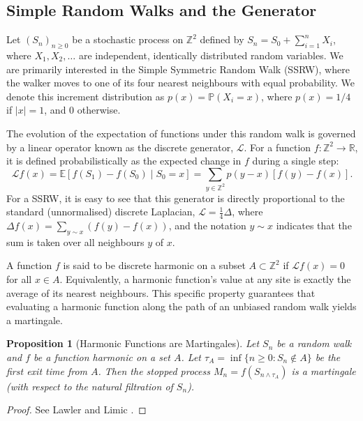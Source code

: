 \documentclass[12pt, a4paper, oneside]{report}
\newtheorem{proposition}[theorem]{Proposition}
\theoremstyle{remark}
\begin{document}
\subsection{Simple Random Walks and the Generator}
\label{sec:rw_generator}

Let $(S_n)_{n \geq 0}$ be a stochastic process on $\mathbb{Z}^2$ defined by $S_n = S_0 + \sum_{i=1}^n X_i$, where $X_1, X_2, \dots$ are independent, identically distributed random variables. We are primarily interested in the Simple Symmetric Random Walk (SSRW), where the walker moves to one of its four nearest neighbours with equal probability. We denote this increment distribution as $p(x) = \mathbb{P}(X_i = x)$, where $p(x) = 1/4$ if $|x| = 1$, and $0$ otherwise.

The evolution of the expectation of functions under this random walk is governed by a linear operator known as the discrete generator, $\mathcal{L}$. For a function $f: \mathbb{Z}^2 \to \mathbb{R}$, it is defined probabilistically as the expected change in $f$ during a single step:
\begin{equation*}
    \mathcal{L}f(x) = \mathbb{E}[f(S_1) - f(S_0) \mid S_0 = x] = \sum_{y \in \mathbb{Z}^2} p(y-x) [f(y) - f(x)].
\end{equation*}
For a SSRW, it is easy to see that this generator is directly proportional to the standard (unnormalised) discrete Laplacian, $\mathcal{L} = \frac{1}{4} \Delta$, where $\Delta f(x) = \sum_{y \sim x} (f(y) - f(x))$, and the notation $y \sim x$ indicates that the sum is taken over all neighbours $y$ of $x$.

A function $f$ is said to be discrete harmonic on a subset $A \subset \mathbb{Z}^2$ if $\mathcal{L}f(x) = 0$ for all $x \in A$. Equivalently, a harmonic function's value at any site is exactly the average of its nearest neighbours. This specific property guarantees that evaluating a harmonic function along the path of an unbiased random walk yields a martingale.

\begin{proposition}[Harmonic Functions are Martingales]
\label{prop:harmonic_martingale}
Let $S_n$ be a random walk and $f$ be a function harmonic on a set $A$. Let $\tau_A = \inf\{n \ge 0 : S_n \notin A\}$ be the first exit time from $A$. 
Then the stopped process $M_n = f(S_{n \wedge \tau_A})$ is a martingale (with respect to the natural filtration of $S_n$).
\end{proposition}
\begin{proof}
See Lawler and Limic \cite[Proposition 6.1.1]{Lawler2010}.
\end{proof}
\end{document}
